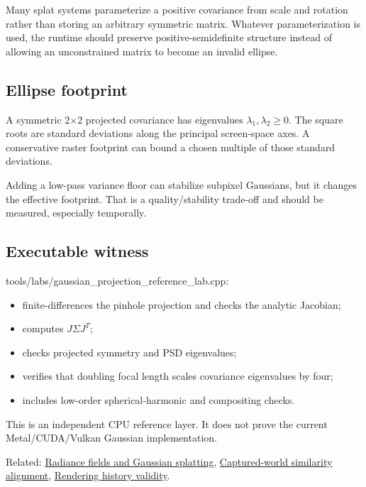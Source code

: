Many splat systems parameterize a positive covariance from scale and rotation rather than storing an arbitrary symmetric matrix. Whatever parameterization is used, the runtime should preserve positive-semidefinite structure instead of allowing an unconstrained matrix to become an invalid ellipse.

\subsection{Ellipse footprint}\label{appendix-24269cb6977c-ellipse-footprint}

A symmetric 2×2 projected covariance has eigenvalues \(\lambda_1,\lambda_2\ge0\). The square roots are standard deviations along the principal screen-space axes. A conservative raster footprint can bound a chosen multiple of those standard deviations.

Adding a low-pass variance floor can stabilize subpixel Gaussians, but it changes the effective footprint. That is a quality/stability trade-off and should be measured, especially temporally.

\subsection{Executable witness}\label{appendix-24269cb6977c-executable-witness}

tools/labs/gaussian\_projection\_reference\_lab.cpp:

\begin{itemize}
\tightlist
\item
  finite-differences the pinhole projection and checks the analytic Jacobian;
\item
  computes \(J\Sigma J^T\);
\item
  checks projected symmetry and PSD eigenvalues;
\item
  verifies that doubling focal length scales covariance eigenvalues by four;
\item
  includes low-order spherical-harmonic and compositing checks.
\end{itemize}

This is an independent CPU reference layer. It does not prove the current Metal/CUDA/Vulkan Gaussian implementation.

Related: \hyperref[appendix-c5b332e400e7]{Radiance fields and Gaussian splatting}, \hyperref[appendix-5f40b4fea463]{Captured-world similarity alignment}, \hyperref[appendix-2e7e9fd28a2c]{Rendering history validity}.

